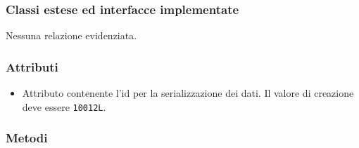 \subsubsection*{Classi estese ed interfacce implementate}

Nessuna relazione evidenziata.

\subsubsection*{Attributi}

\begin{itemize}
	\item{}
	Attributo contenente l'id per la serializzazione dei dati. Il valore di creazione deve essere \texttt{10012L}.
\end{itemize}

\subsubsection*{Metodi}

